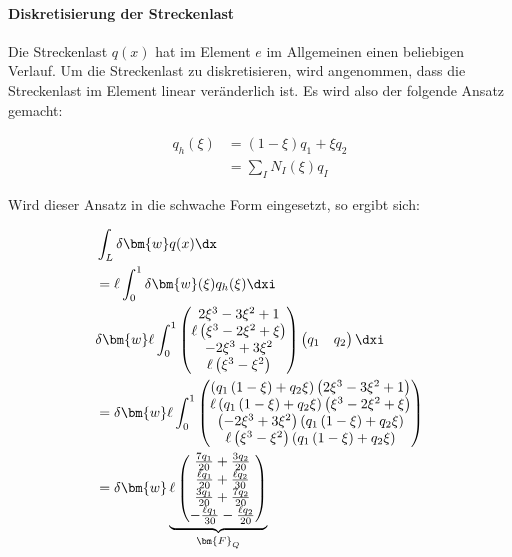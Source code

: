 \paragraph{Diskretisierung der Streckenlast}

Die Streckenlast $q(x)$ hat im Element $e$ im Allgemeinen einen beliebigen Verlauf. Um die Streckenlast zu diskretisieren, wird angenommen, dass die Streckenlast im Element linear veränderlich ist. Es wird also der folgende Ansatz gemacht:

\begin{align}
  q_h(\xi) & = (1-\xi) q_1 + \xi q_2 \\
  & = \sum_I N_I(\xi)  q_I
\end{align}

Wird dieser Ansatz in die schwache Form eingesetzt, so ergibt sich:

\begin{align}
  & \int_L \delta \bm{w}  q(x) \dx \\
  & = \ell \int_{0}^1  \delta \bm{w}(\xi) q_h(\xi)  \dxi \\
  & \delta \bm{w} \ell \int_{0}^1 \begin{pmatrix} 2 \xi^{3} - 3 \xi^{2} + 1\\\ell \left(\xi^{3} - 2 \xi^{2} + \xi\right)\\- 2 \xi^{3} + 3 \xi^{2}\\\ell \left(\xi^{3} - \xi^{2}\right)\end{pmatrix} \begin{pmatrix} q_1 & q_2  \end{pmatrix} \dxi \\
  & = \delta \bm{w} \ell \int_{0}^1 \begin{pmatrix}
  \left(q_{1} \left(1 - \xi\right) + q_{2} \xi\right) \left(2 \xi^{3} - 3 \xi^{2} + 1\right)\\\ell \left(q_{1} \left(1 - \xi\right) + q_{2} \xi\right) \left(\xi^{3} - 2 \xi^{2} + \xi\right)\\\left(- 2 \xi^{3} + 3 \xi^{2}\right) \left(q_{1} \left(1 - \xi\right) + q_{2} \xi\right)\\\ell \left(\xi^{3} - \xi^{2}\right) \left(q_{1} \left(1 - \xi\right) + q_{2} \xi\right)
  \end{pmatrix} \\
  & = \delta \bm{w} \underbrace{ \ell \begin{pmatrix}
  \frac{7 q_{1}}{20} + \frac{3 q_{2}}{20}\\\frac{\ell q_{1}}{20} + \frac{\ell q_{2}}{30}\\\frac{3 q_{1}}{20} + \frac{7 q_{2}}{20}\\- \frac{\ell q_{1}}{30} - \frac{\ell q_{2}}{20}
  \end{pmatrix}}_{\bm{F}_Q}
\end{align}

